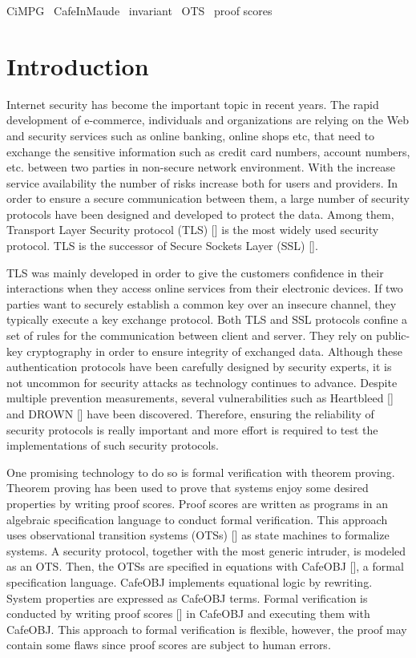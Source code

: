 \documentclass[a4paper,fleqn]{cas-dc}
\begin{document}
\begin{keywords}
 CiMPG \ CafeInMaude \ invariant \ OTS \ proof scores
\end{keywords}

\section{Introduction}\label{intro}
Internet security has become the important topic in recent years. The rapid development of e-commerce, individuals and organizations are relying on the Web and security services such as online banking, online shops etc, that need to exchange the sensitive information such as credit card numbers, account numbers, etc. between two parties in non-secure network environment. With the increase service availability the number of risks increase both for users and providers. In order to ensure a secure communication between them, a large number of security protocols have been designed and developed to protect the data. Among them, Transport Layer Security protocol (TLS) [\cite{dierk}] is the most widely used security protocol. TLS is the successor of Secure Sockets Layer (SSL) [\cite{1621007}]. 

TLS was mainly developed in order to give the customers
confidence in their interactions when they access online services
from their electronic devices. If two parties want to securely establish a common key over an insecure channel, they typically execute a key exchange protocol. Both TLS and SSL protocols confine a set of rules for the communication between client and server. They rely on public-key cryptography in order to ensure integrity of exchanged data. Although  these  authentication  protocols  have been carefully designed by security experts, it is not uncommon for security attacks  as  technology  continues  to  advance. Despite multiple prevention measurements, several vulnerabilities such as  
Heartbleed [\cite{10.1145/2663716.2663755}] and DROWN [\cite{197245}] have been discovered. Therefore, ensuring the reliability of security protocols is really important and more effort is required to test the implementations of such security protocols.

One promising technology to do so is formal verification  with theorem  proving. Theorem proving has been used to prove that systems enjoy some desired properties by writing proof scores. Proof scores are written as programs in an algebraic specification language to conduct formal verification. This approach uses observational transition systems (OTSs) [\cite{OgataF03fmoods}] as state machines to formalize systems. A security protocol, together with the most generic intruder, is modeled as an OTS. Then, the OTSs are specified in equations with CafeOBJ [\cite{DiaconescuF98amast}], a formal specification language. CafeOBJ implements equational logic by rewriting. System properties are expressed as CafeOBJ terms. Formal verification is conducted by writing proof scores [\cite{OgataF03fmoods}] in CafeOBJ and executing them with CafeOBJ. This approach to formal verification is flexible, however, the proof may contain some flaws since proof scores are subject to human errors. 
\end{document}
